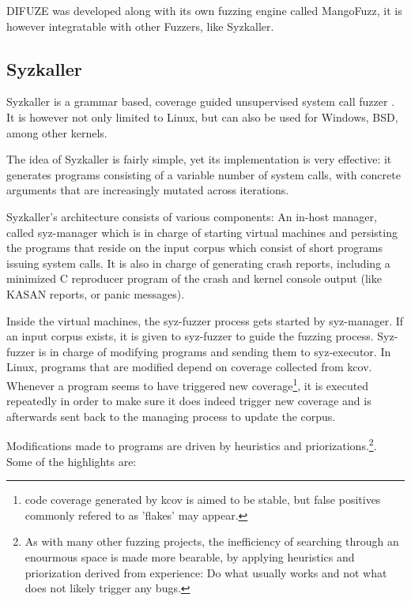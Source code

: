 DIFUZE was developed along with its own fuzzing engine called MangoFuzz, it is however integratable with other Fuzzers, like Syzkaller.

\subsection{Syzkaller}\label{ss:syzkaller}

Syzkaller is a grammar based, coverage guided unsupervised
system call fuzzer \cite{GoogleSyzkaller2021}. It is however not only
limited to Linux, but can also be used for Windows, BSD, among other
kernels.

The idea of Syzkaller is fairly simple, yet its implementation is very effective: it generates
programs consisting of a variable number of system calls, with
concrete arguments that are increasingly mutated across iterations.

Syzkaller's architecture consists of various components: An in-host manager, called
syz-manager which is in charge of starting virtual machines and persisting the programs that
reside on the input corpus which consist of short programs issuing
system calls. It is also in charge of generating crash reports, including a minimized C reproducer program of the crash and kernel console output (like KASAN reports, or panic
messages).

Inside the virtual machines, the syz-fuzzer process gets started by syz-manager. If an input
corpus exists, it is given to syz-fuzzer to guide the fuzzing process. Syz-fuzzer is
in charge of modifying programs and sending them to syz-executor. In Linux, programs that
are modified depend on coverage collected from kcov. Whenever a program seems to have triggered new coverage\footnote{code coverage generated by kcov is aimed to be stable, but false positives commonly refered to as 'flakes' may appear.},
it is executed repeatedly in order to make sure it does indeed trigger new coverage and is
afterwards sent back to the managing process to update the corpus.

Modifications made to programs are driven by heuristics and priorizations.\footnote{As with many other fuzzing projects, the inefficiency of searching through an enourmous space is made more bearable, by applying heuristics and priorization derived from experience: Do what usually works and not what does not likely trigger any bugs.}. Some of the highlights are\cite{vyukovSyzkallerAdventuresContinuous2020}:


